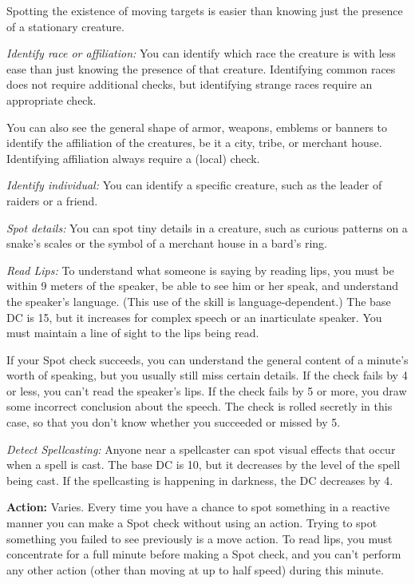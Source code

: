 Spotting the existence of moving targets is easier than knowing just the presence of a stationary creature.

\emph{Identify race or affiliation:} You can identify which race the creature is with less ease than just knowing the presence of that creature. Identifying common races does not require additional checks, but identifying strange races require an appropriate  check.

You can also see the general shape of armor, weapons, emblems or banners to identify the affiliation of the creatures, be it a city, tribe, or merchant house. Identifying affiliation always require a  (local) check.

\emph{Identify individual:} You can identify a specific creature, such as the leader of raiders or a friend.

\emph{Spot details:} You can spot tiny details in a creature, such as curious patterns on a snake's scales or the symbol of a merchant house in a bard's ring.

\textit{Read Lips:} To understand what someone is saying by reading lips, you must be within 9 meters of the speaker, be able to see him or her speak, and understand the speaker's language. (This use of the skill is language-dependent.) The base DC is 15, but it increases for complex speech or an inarticulate speaker. You must maintain a line of sight to the lips being read.

If your Spot check succeeds, you can understand the general content of a minute's worth of speaking, but you usually still miss certain details. If the check fails by 4 or less, you can't read the speaker's lips. If the check fails by 5 or more, you draw some incorrect conclusion about the speech. The check is rolled secretly in this case, so that you don't know whether you succeeded or missed by 5.

\textit{Detect Spellcasting:} Anyone near a spellcaster can spot visual effects that occur when a spell is cast. The base DC is 10, but it decreases by the level of the spell being cast. If the spellcasting is happening in darkness, the DC decreases by 4.

\textbf{Action:} Varies. Every time you have a chance to spot something in a reactive manner you can make a Spot check without using an action. Trying to spot something you failed to see previously is a move action. To read lips, you must concentrate for a full minute before making a Spot check, and you can't perform any other action (other than moving at up to half speed) during this minute.

